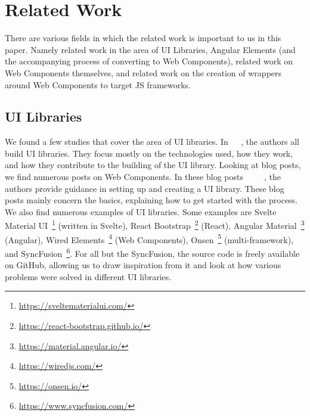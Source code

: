 \section{Related Work}\label{sec:related-work}

There are various fields in which the related work is important to us in this paper. Namely related work in the area of UI Libraries, Angular Elements (and the accompanying process of converting to Web Components), related work on Web Components themselves, and related work on the creation of wrappers around Web Components to target JS frameworks.

\subsection{UI Libraries}
We found a few studies that cover the area of UI libraries. In~\cite{ky2019ui}~\cite{annala2017documentation}~\cite{mrazcomponent}, the authors all build UI libraries. They focus mostly on the technologies used, how they work, and how they contribute to the building of the UI library. Looking at blog posts, we find numerous posts on Web Components. In these blog posts~~~~~, the authors provide guidance in setting up and creating a UI library. These blog posts mainly concern the basics, explaining how to get started with the process. We also find numerous examples of UI libraries. Some examples are Svelte Material UI~\footnote{\url{https://sveltematerialui.com/}} (written in Svelte), React Bootstrap~\footnote{\url{https://react-bootstrap.github.io/}} (React), Angular Material~\footnote{\url{https://material.angular.io/}} (Angular), Wired Elements~\footnote{\url{https://wiredjs.com/}} (Web Components), Onsen~\footnote{\url{https://onsen.io/}} (multi-framework), and SyncFusion~\footnote{\url{https://www.syncfusion.com/}}. For all but the SyncFusion, the source code is freely available on GitHub, allowing us to draw inspiration from it and look at how various problems were solved in different UI libraries.

